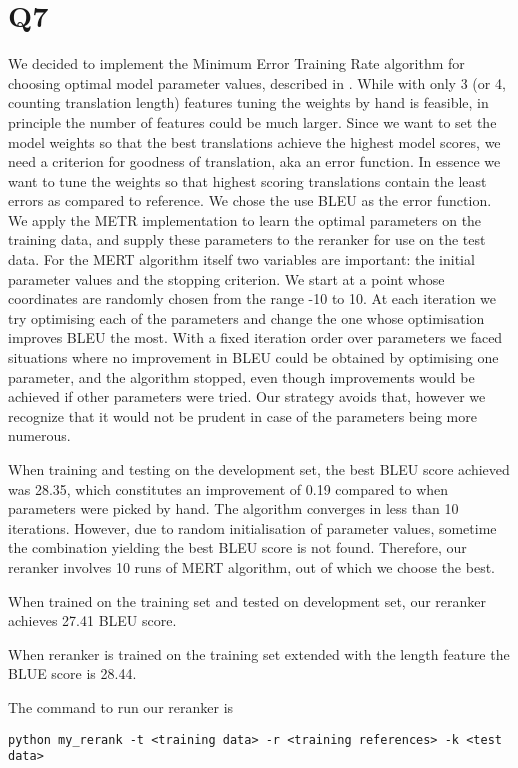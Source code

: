 \section*{Q7}
We decided to implement the Minimum Error Training Rate algorithm for choosing optimal model parameter values, described in \cite{och2003}. While with only 3 (or 4, counting translation length) features tuning the weights by hand is feasible, in principle the number of features could be much larger. Since we want to set the model weights so that the best translations achieve the highest model scores, we need a criterion for goodness of translation, aka an error function. In essence we want to tune the weights so that highest scoring translations contain the least errors as compared to reference. We chose the use BLEU as the error function. We apply the METR implementation to learn the optimal parameters on the training data, and supply these parameters to the reranker for use on the test data.
For the MERT algorithm itself two variables are important: the initial parameter values and the stopping criterion. We start at a point whose coordinates are randomly chosen from the range -10 to 10. At each iteration we try optimising each of the parameters and change the one whose optimisation improves BLEU the most. With a fixed iteration order over parameters we faced situations where no improvement in BLEU could be obtained by optimising one parameter, and the algorithm stopped, even though improvements would be achieved if other parameters were tried. Our strategy avoids that, however we recognize that it would not be prudent in case of the parameters being more numerous.

When training and testing on the development set, the best BLEU score achieved was 28.35, which constitutes an improvement of 0.19 compared to when parameters were picked by hand. The algorithm converges in less than 10 iterations. However, due to random initialisation of parameter values, sometime the combination yielding the best BLEU score is not found. Therefore, our reranker involves 10 runs of MERT algorithm, out of which we choose the best.

When trained on the training set and tested on development set, our reranker achieves 27.41 BLEU score.

When reranker is trained on the training set extended with the length feature the BLUE score is 28.44.

The command to run our reranker is
\begin{lstlisting}
python my_rerank -t <training data> -r <training references> -k <test data>
\end{lstlisting}
